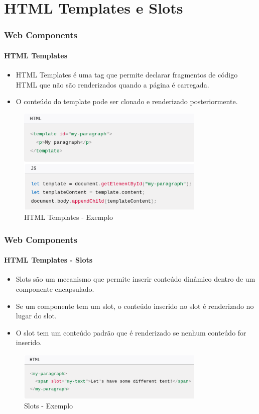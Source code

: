 \documentclass[
	9pt, %
	t, %
]{beamer}
\begin{document}
\section{HTML Templates e Slots}

\begin{frame}
	\frametitle{Web Components}
	\framesubtitle{HTML Templates}
	\begin{itemize}
		\item HTML Templates é uma tag que permite declarar fragmentos de código HTML que não são renderizados quando a página é carregada.
		\item O conteúdo do template pode ser clonado e renderizado posteriormente.
	\end{itemize}

	\begin{figure}
		\centering
		\includegraphics[width=0.8\textwidth]{html_templates.png}
		\caption{HTML Templates - Exemplo}
	\end{figure}

\end{frame}

\begin{frame}
	\frametitle{Web Components}
	\framesubtitle{HTML Templates - Slots}
	\begin{itemize}
		\item Slots são um mecanismo que permite inserir conteúdo dinâmico dentro de um componente encapsulado.
		\item Se um componente tem um slot, o conteúdo inserido no slot é renderizado no lugar do slot.
		\item O slot tem um conteúdo padrão que é renderizado se nenhum conteúdo for inserido.
	\end{itemize}

	\begin{figure}
		\centering
		\includegraphics[width=0.8\textwidth]{html_slots.png}
		\caption{Slots - Exemplo}
	\end{figure}

\end{frame}
\end{document}
